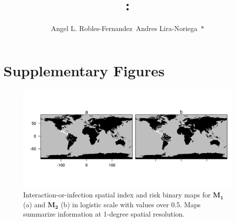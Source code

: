 \documentclass[utf8]{frontiers_suppmat} %
\def\firstAuthorLast{Robles-Fernandez and Lira-Noriega}
\def\Authors{Angel L. Robles-Fernandez\, Andres Lira-Noriega\ $*$}
\begin{document}
\onecolumn
{}

\title[Supplementary Material]{{}:
\\ } %
\author[\firstAuthorLast ]{\Authors} 
\correspondance{} 
\extraAuth{}
\maketitle

\section{Supplementary Figures}

\begin{figure}[h!]
\begin{center}
\includegraphics[width=15cm]{S1}%
\end{center}
\caption{Interaction-or-infection spatial index and risk binary maps for $\mathbf{M_1}$ (a) and $\mathbf{M_2}$ (b) in logistic scale with values over 0.5. Maps summarize information at 1-degree spatial resolution. } \label{fig:1}
\end{figure}
\end{document}
